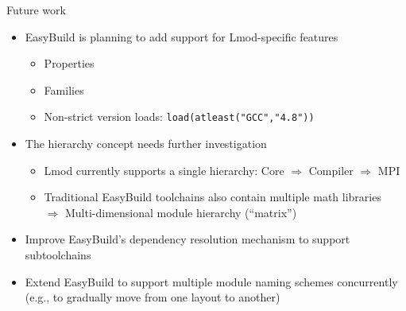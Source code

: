 \documentclass[10pt,xcolor={usenames,dvipsnames}]{beamer}
\begin{document}
\begin{frame}{Future work}
\begin{itemize}
    \item
        EasyBuild is planning to add support for Lmod-specific features
        \begin{itemize}
            \item
                Properties
            \item
                Families
            \item
                Non-strict version loads: \texttt{load(atleast("GCC","4.8"))}
        \end{itemize}
    \smallskip
    \item
        The hierarchy concept needs further investigation
        \begin{itemize}
            \item
                Lmod currently supports a single hierarchy:
                Core $\Rightarrow$ Compiler $\Rightarrow$ MPI
            \item
                Traditional EasyBuild toolchains also contain multiple math
                libraries\\
                $\Rightarrow$ Multi-dimensional module hierarchy (``matrix'')
        \end{itemize}
    \smallskip
    \item
        Improve EasyBuild's dependency resolution mechanism to support
        subtoolchains
    \smallskip
    \item
        Extend EasyBuild to support multiple module naming schemes concurrently
        (e.g., to gradually move from one layout to another)
\end{itemize}
\end{frame}

\end{document}

